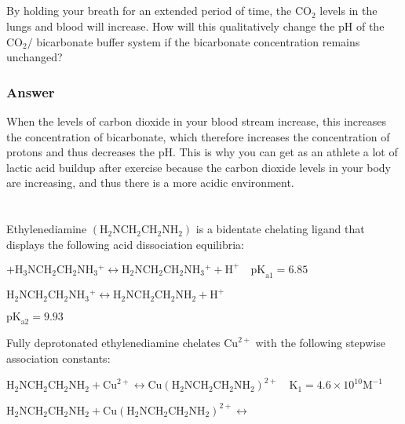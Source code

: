 \documentclass[12pt]{article}
\begin{document}
\subsection{}
By holding your breath for an extended period of time, the $\mathrm{CO}_{2}$ levels in the lungs and blood will increase. How will this qualitatively change the $\mathrm{pH}$ of the $\mathrm{CO}_{2} /$ bicarbonate buffer system if the bicarbonate concentration remains unchanged?
\subsubsection{Answer}
When the levels of carbon dioxide in your blood stream increase, this increases the concentration of bicarbonate, which therefore increases the concentration of protons and thus decreases the $\mathrm{pH}$. This is why you can get as an athlete a lot of lactic acid buildup after exercise because the carbon dioxide levels in your body are increasing, and thus there is a more acidic environment.

\section{}


Ethylenediamine $\left(\mathrm{H}_{2} \mathrm{NCH}_{2} \mathrm{CH}_{2} \mathrm{NH}_{2}\right)$ is a bidentate chelating ligand that displays the following acid dissociation equilibria:

$+\mathrm{H}_{3} \mathrm{NCH}_{2} \mathrm{CH}_{2} \mathrm{NH}_{3}{ }^{+} \leftrightarrow \mathrm{H}_{2} \mathrm{NCH}_{2} \mathrm{CH}_{2} \mathrm{NH}_{3}{ }^{+}+\mathrm{H}^{+} \quad \mathrm{pK}_{\mathrm{a} 1}=6.85$

$\mathrm{H}_{2} \mathrm{NCH}_{2} \mathrm{CH}_{2} \mathrm{NH}_{3}{ }^{+} \leftrightarrow \mathrm{H}_{2} \mathrm{NCH}_{2} \mathrm{CH}_{2} \mathrm{NH}_{2}+\mathrm{H}^{+}$

$\mathrm{pK}_{\mathrm{a} 2}=9.93$

Fully deprotonated ethylenediamine chelates $\mathrm{Cu}^{2+}$ with the following stepwise association constants:

$\mathrm{H}_{2} \mathrm{NCH}_{2} \mathrm{CH}_{2} \mathrm{NH}_{2}+\mathrm{Cu}^{2+} \leftrightarrow \mathrm{Cu}\left(\mathrm{H}_{2} \mathrm{NCH}_{2} \mathrm{CH}_{2} \mathrm{NH}_{2}\right)^{2+} \quad \mathrm{K}_{1}=4.6 \times 10^{10} \mathrm{M}^{-1}$

$\mathrm{H}_{2} \mathrm{NCH}_{2} \mathrm{CH}_{2} \mathrm{NH}_{2}+\mathrm{Cu}\left(\mathrm{H}_{2} \mathrm{NCH}_{2} \mathrm{CH}_{2} \mathrm{NH}_{2}\right)^{2+} \leftrightarrow$
\end{document}
